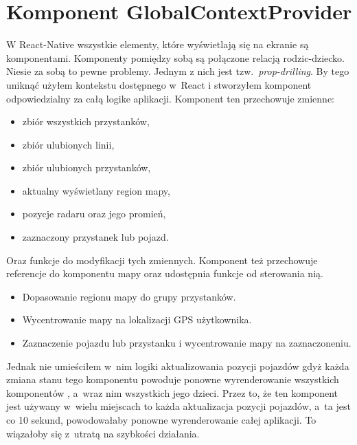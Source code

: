 \documentclass{SGGW-thesis}
\begin{document}
\section{Komponent GlobalContextProvider}
W React-Native wszystkie elementy, które wyświetlają się na ekranie są komponentami.
Komponenty pomiędzy sobą są połączone relacją rodzic-dziecko.
Niesie za sobą to pewne problemy.
Jednym z nich jest tzw.~\textit{prop-drilling}. %
By tego uniknąć użyłem kontekstu dostępnego w~React i stworzyłem komponent  odpowiedzialny za całą logike aplikacji.
Komponent ten przechowuje zmienne:
\begin{itemize}
  \item{zbiór wszystkich przystanków,}
  \item{zbiór ulubionych linii,}
  \item{zbiór ulubionych przystanków,}
  \item{aktualny wyświetlany region mapy,}
  \item{pozycje radaru oraz jego promień,}
  \item{zaznaczony przystanek lub pojazd.}
\end{itemize}
Oraz funkcje do modyfikacji tych zmiennych. %
Komponent też przechowuje referencje do komponentu mapy oraz udostępnia funkcje od sterowania nią.
\begin{itemize}
  \item{Dopasowanie regionu mapy do grupy przystanków.}
  \item{Wycentrowanie mapy na lokalizacji GPS użytkownika.}
  \item{Zaznaczenie pojazdu lub przystanku i wycentrowanie mapy na zaznaczoneniu.}
\end{itemize}

Jednak nie umieściłem w~nim logiki aktualizowania pozycji pojazdów gdyż każda zmiana stanu
tego komponentu powoduje ponowne wyrenderowanie wszystkich komponentów , a~wraz nim wszystkich jego dzieci.
Przez to, że ten komponent jest używany w~wielu miejscach to każda aktualizacja pozycji pojazdów, a~ta
jest co 10 sekund, powodowałaby ponowne wyrenderowanie całej aplikacji.
To wiązałoby się z~utratą na szybkości działania.
\end{document}
